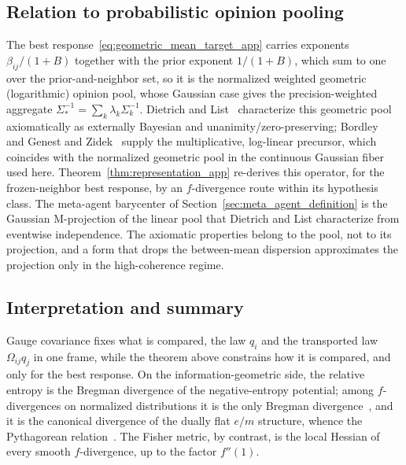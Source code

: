 \documentclass[11pt]{article}
\begin{document}
\subsection*{Relation to probabilistic opinion pooling}
The best response~\eqref{eq:geometric_mean_target_app} carries exponents $\beta_{ij}/(1+B)$ together with the prior exponent $1/(1+B)$, which sum to one over the prior-and-neighbor set, so it is the normalized weighted geometric (logarithmic) opinion pool, whose Gaussian case gives the precision-weighted aggregate $\Sigma_*^{-1} = \sum_k \lambda_k \Sigma_k^{-1}$. Dietrich and List~\cite{dietrich2016probabilistic} characterize this geometric pool axiomatically as externally Bayesian and unanimity/zero-preserving; Bordley~\cite{bordley1982multiplicative} and Genest and Zidek~\cite{GenestZidek1986} supply the multiplicative, log-linear precursor, which coincides with the normalized geometric pool in the continuous Gaussian fiber used here. Theorem~\ref{thm:representation_app} re-derives this operator, for the frozen-neighbor best response, by an $f$-divergence route within its hypothesis class. The meta-agent barycenter of Section~\ref{sec:meta_agent_definition} is the Gaussian M-projection of the linear pool that Dietrich and List characterize from eventwise independence. The axiomatic properties belong to the pool, not to its projection, and a form that drops the between-mean dispersion approximates the projection only in the high-coherence regime.

\subsection*{Interpretation and summary}
Gauge covariance fixes what is compared, the law $q_i$ and the transported law $\Omega_{ij}q_j$ in one frame, while the theorem above constrains how it is compared, and only for the best response. On the information-geometric side, the relative entropy is the Bregman divergence of the negative-entropy potential; among $f$-divergences on normalized distributions it is the only Bregman divergence~\cite{Amari2009alpha}, and it is the canonical divergence of the dually flat $e/m$ structure, whence the Pythagorean relation~\cite{AmariNagaoka2000}. The Fisher metric, by contrast, is the local Hessian of every smooth $f$-divergence, up to the factor $f''(1)$.
\end{document}
